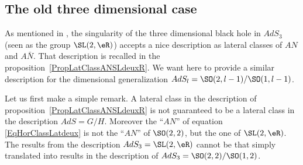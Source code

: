 					\subsection{The old three dimensional case}

As mentioned in \cite{Keio}, the singularity of the three dimensional black hole in $AdS_3$ (seen as the group $\SL(2,\eR)$) accepts a nice description as lateral classes of $AN$ and $A\bar N$. That description is recalled in the proposition~\ref{PropLatClassANSLdeuxR}. We want here to provide a similar description for the dimensional generalization $AdS_l=\SO(2,l-1)/\SO(1,l-1)$.

Let us first make a simple remark. A lateral class in the description of proposition~\ref{PropLatClassANSLdeuxR} is not guaranteed to be a lateral class in the description $AdS=G/H$. Moreover the ``$AN$'' of equation  \eqref{EqHorClassLatdeux} is not the ``$AN$'' of $\SO(2,2)$, but the one of $\SL(2,\eR)$. The results from the description $AdS_3=\SL(2,\eR)$ cannot be that simply translated into results in the description of $AdS_3=\SO(2,2)/\SO(1,2)$.


